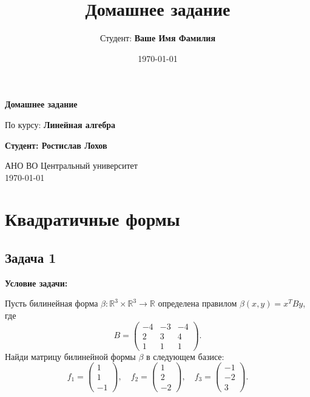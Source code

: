 \documentclass[a4paper,12pt]{article}
\title{Домашнее задание}
\author{Студент: \textbf{Ваше Имя Фамилия}}
\date{\today}
\begin{document}
\begin{titlepage}
    \centering
    \vspace*{1cm}

    \Huge
    \textbf{Домашнее задание}

    \vspace{0.5cm}
    \LARGE
    По курсу: \textbf{Линейная алгебра}

    \vspace{1.5cm}

    \textbf{Студент: Ростислав Лохов}

    \vfill

    \Large
    АНО ВО Центральный университет\\
    \vspace{0.3cm}
    \today

\end{titlepage}

\tableofcontents
\newpage

\section{Квадратичные формы}

\subsection{Задача 1}
\textbf{Условие задачи:}

Пусть билинейная форма $\beta : \mathbb{R}^3 \times \mathbb{R}^3 \to \mathbb{R}$ определена правилом $\beta(x,y) = x^T By$, где
$$
B =
\begin{pmatrix}
-4 & -3 & -4 \\
2 & 3 & 4 \\
1 & 1 & 1
\end{pmatrix}.
$$
Найди матрицу билинейной формы $\beta$ в следующем базисе:
$$
f_1 =
\begin{pmatrix}
1 \\
1 \\
-1
\end{pmatrix}, \quad
f_2 =
\begin{pmatrix}
1 \\
2 \\
-2
\end{pmatrix}, \quad
f_3 =
\begin{pmatrix}
-1 \\
-2 \\
3
\end{pmatrix}.
$$
\end{document}
